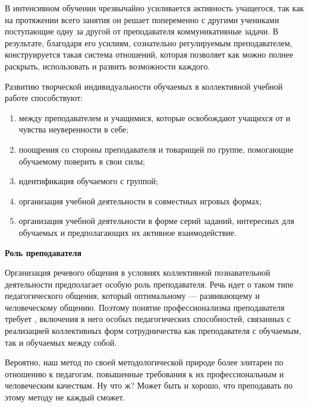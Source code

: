 В интенсивном обучении чрезвычайно усиливается активность учащегося, так как на протяжении всего занятия он решает попеременно с другими учениками поступающие одну за другой от преподавателя коммуникативные задачи. В результате, благодаря его усилиям, сознательно регулируемым преподавателем, конструируется такая система отношений, которая позволяет как можно полнее раскрыть, использовать и развить возможности каждого.

Развитию творческой индивидуальности обучаемых в коллективной учебной работе способствуют:
\begin{enumerate}
    \item {} между преподавателем и учащимися, которые освобождают учащихся от  и чувства неуверенности в себе;
    \item поощрения со стороны преподавателя и товарищей по группе, помогающие обучаемому поверить в свои силы;
    \item идентификация обучаемого с группой;
    \item организация учебной деятельности в совместных игровых формах;
    \item организация учебной деятельности в форме серий заданий, интересных для обучаемых и предполагающих их активное взаимодействие.
\end{enumerate}

\textbf{Роль преподавателя }

Организация речевого общения в условиях коллективной познавательной деятельности предполагает особую роль преподавателя. Речь идет о таком типе педагогического общения, который  оптимальному --- развивающему и  человеческому общению. Поэтому понятие профессионализма преподавателя требует , включения в него особых педагогических способностей, связанных с реализацией коллективных форм сотрудничества как преподавателя с обучаемым, так и обучаемых между собой.

Вероятно, наш метод по своей методологической природе более элитарен по отношению к педагогам,  повышенные требования к их профессиональным и человеческим качествам. Ну что ж? Может быть и хорошо, что преподавать по этому методу не каждый сможет.

